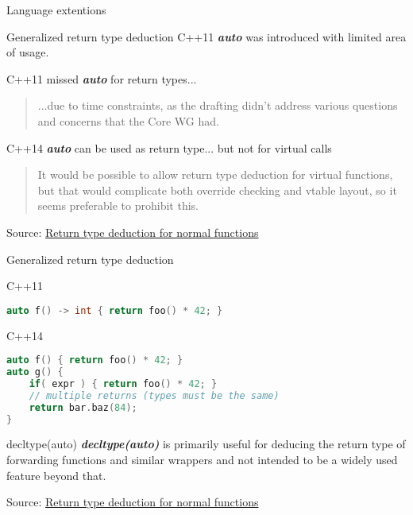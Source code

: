 \documentclass{beamer}
\begin{document}
\begin{frame}
\begin{center}
\huge Language extentions
\end{center}
\end{frame}


\begin{frame}{Generalized return type deduction}
C++11 \textbf{\textit{auto}} was introduced with limited area of usage. 

C++11 missed \textbf{\textit{auto}} for return types... 
\begin{quote}
...due to time constraints, as the drafting didn't address various questions and concerns that the Core WG had.
\end{quote}

C++14 \textbf{\textit{auto}} can be used as return type... but not for virtual calls
\begin{quote}
It would be possible to allow return type deduction for virtual functions, but that would complicate both override checking and vtable layout, so it seems preferable to prohibit this. 
\end{quote}

\vfill
Source: \href{http://www.open-std.org/jtc1/sc22/wg21/docs/papers/2013/n3638.html}{Return type deduction for normal functions}
\end{frame}

\begin{frame}[fragile]{Generalized return type deduction}
\begin{block}{C++11}
\begin{lstlisting}[firstnumber=1, label=glabels, xleftmargin=5pt, language=C++] 
auto f() -> int { return foo() * 42; }
\end{lstlisting}
\end{block}

\begin{block}{C++14}
\begin{lstlisting}[firstnumber=1, label=glabels, xleftmargin=5pt, language=C++] 
auto f() { return foo() * 42; }
auto g() {
    if( expr ) { return foo() * 42; }
    // multiple returns (types must be the same)
    return bar.baz(84); 
}
\end{lstlisting}
\end{block}
\end{frame}

\begin{frame}{decltype(auto)}
\textbf{\textit{decltype(auto)}} is primarily useful for deducing the return type of forwarding functions and similar wrappers and not intended to be a widely used feature beyond that.

\vfill
Source: \href{http://www.open-std.org/jtc1/sc22/wg21/docs/papers/2013/n3638.html}{Return type deduction for normal functions}
\end{frame}
\end{document}
